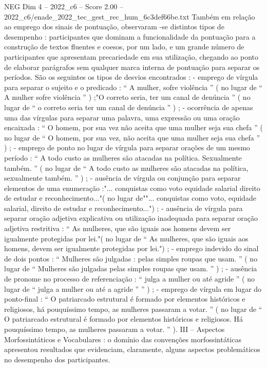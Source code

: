 \begin{textsample}{NEG Dim 4 – 2022\_c6 – Score 2.00 – 2022\_c6/enade\_2022\_tec\_gest\_rec\_hum\_6c3def66be.txt}
Também em relação ao emprego dos sinais de pontuação, observaram -se distintos tipos de desempenho : participantes que dominam a funcionalidade da pontuação para a construção de textos fluentes e coesos, por um lado, e um grande número de participantes que apresentam precariedade em sua utilização, chegando ao ponto de elaborar parágrafos sem qualquer marca interna de pontuação para separar os períodos.
São os seguintes os tipos de desvios encontrados : - emprego de vírgula para separar o sujeito e o predicado : “ A mulher, sofre violência ” ( no lugar de “ A mulher sofre violência ” ) ;"O correto seria, ter um canal de denúncia ” ( no lugar de “ o correto seria ter um canal de denúncia ” ) ; - ocorrência de apenas uma das vírgulas para separar uma palavra, uma expressão ou uma oração encaixada : “ O homem, por sua vez não aceita que uma mulher seja sua chefa ” ( no lugar de “ O homem, por sua vez, não aceita que uma mulher seja sua chefa ” ) ; - emprego de ponto no lugar de vírgula para separar orações de um mesmo período : “ A todo custo as mulheres são atacadas na política.
Sexualmente também. ” ( no lugar de “ A todo custo as mulheres são atacadas na política, sexualmente também. ” ) ; - ausência de vírgula ou conjunção para separar elementos de uma enumeração :"... conquistas como voto equidade salarial direito de estudar e reconhecimento..."( no lugar de""... conquistas como voto, equidade salarial, direito de estudar e reconhecimento...") ; - ausência de vírgula para separar oração adjetiva explicativa ou utilização inadequada para separar oração adjetiva restritiva : “ As mulheres, que são iguais aos homens devem ser igualmente protegidas por lei."( no lugar de “ As mulheres, que são iguais aos homens, devem ser igualmente protegidas por lei.") ; - emprego indevido do sinal de dois pontos : “ Mulheres são julgadas : pelas simples roupas que usam. ” ( no lugar de “ Mulheres são julgadas pelas simples roupas que usam. ” ) ; - ausência de pronome no processo de referenciação : “ julga a mulher ou até agride ” ( no lugar de “ julga a mulher ou até a agride ” ” ) ; - emprego de vírgula em lugar do ponto-final : “ O patriarcado estrutural é formado por elementos históricos e religiosos, há pouquíssimo tempo, as mulheres passaram a votar. ” ( no lugar de “ O patriarcado estrutural é formado por elementos históricos e religiosos.
Há pouquíssimo tempo, as mulheres passaram a votar. ” ).
III – Aspectos Morfossintáticos e Vocabulares : o domínio das convenções morfossintáticas apresentou resultados que evidenciam, claramente, alguns aspectos problemáticos no desempenho dos participantes.

\end{textsample}
